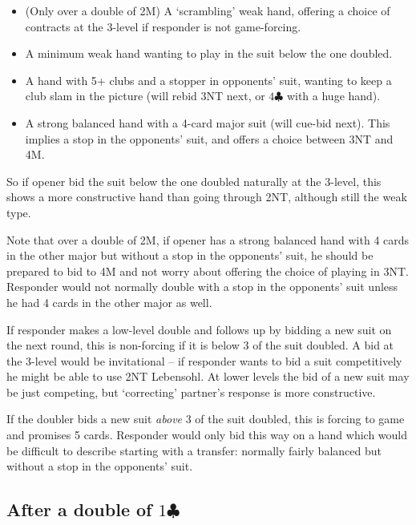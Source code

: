 \documentclass{article}
\newcommand{\cz}{\clubsuit}
\begin{document}
\begin{itemize}
\item (Only over a double of 2M) A `scrambling' weak hand, offering a choice of contracts at the 3-level if responder is not game-forcing.
\item A minimum weak hand wanting to play in the suit below the one doubled.
\item A hand with 5+ clubs and a stopper in opponents' suit, wanting to keep a club slam in the picture (will rebid 3NT next, or $4\cz$ with a huge hand).
\item A strong balanced hand with a 4-card major suit (will cue-bid next). This implies a stop in the opponents' suit, and offers a choice between 3NT and 4M.
\end{itemize}
So if opener bid the suit below the one doubled naturally at the 3-level, this shows a more constructive hand than going through 2NT, although still the weak type.

Note that over a double of 2M, if opener has a strong balanced hand with 4 cards in the other major but without a stop in the opponents' suit, he should be prepared to bid to 4M and not worry about offering the choice of playing in 3NT. Responder would not normally double with a stop in the opponents' suit unless he had 4 cards in the other major as well.

\vspace{4mm}
If responder makes a low-level double and follows up by bidding a new suit on the next round, this is non-forcing if it is below 3 of the suit doubled. A bid at the 3-level would be invitational -- if responder wants to bid a suit competitively he might be able to use 2NT Lebensohl. At lower levels the bid of a new suit may be just competing, but `correcting' partner's response is more constructive.

If the doubler bids a new suit \emph{above} 3 of the suit doubled, this is forcing to game and promises 5 cards. Responder would only bid this way on a hand which would be difficult to describe starting with a transfer: normally fairly balanced but without a stop in the opponents' suit.

\subsection{After a double of $1\cz$}
\end{document}
